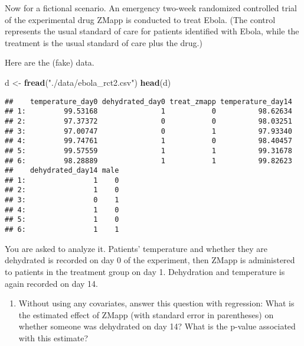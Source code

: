 \documentclass[
]{article}
\newenvironment{Shaded}{\begin{snugshade}}{\end{snugshade}}
\newcommand{\DataTypeTok}[1]{\textcolor[rgb]{0.13,0.29,0.53}{#1}}
\newcommand{\DecValTok}[1]{\textcolor[rgb]{0.00,0.00,0.81}{#1}}
\newcommand{\KeywordTok}[1]{\textcolor[rgb]{0.13,0.29,0.53}{\textbf{#1}}}
\newcommand{\NormalTok}[1]{#1}
\newcommand{\OperatorTok}[1]{\textcolor[rgb]{0.81,0.36,0.00}{\textbf{#1}}}
\newcommand{\StringTok}[1]{\textcolor[rgb]{0.31,0.60,0.02}{#1}}
\providecommand{\tightlist}{%
  \setlength{\itemsep}{0pt}\setlength{\parskip}{0pt}}
\begin{document}
Now for a fictional scenario. An emergency two-week randomized
controlled trial of the experimental drug ZMapp is conducted to treat
Ebola. (The control represents the usual standard of care for patients
identified with Ebola, while the treatment is the usual standard of care
plus the drug.)

Here are the (fake) data.

\begin{Shaded}
\begin{Highlighting}[]
\NormalTok{d <-}\StringTok{ }\KeywordTok{fread}\NormalTok{(}\StringTok{"./data/ebola_rct2.csv"}\NormalTok{)}
\KeywordTok{head}\NormalTok{(d)}
\end{Highlighting}
\end{Shaded}

\begin{verbatim}
##    temperature_day0 dehydrated_day0 treat_zmapp temperature_day14
## 1:         99.53168               1           0          98.62634
## 2:         97.37372               0           0          98.03251
## 3:         97.00747               0           1          97.93340
## 4:         99.74761               1           0          98.40457
## 5:         99.57559               1           1          99.31678
## 6:         98.28889               1           1          99.82623
##    dehydrated_day14 male
## 1:                1    0
## 2:                1    0
## 3:                0    1
## 4:                1    0
## 5:                1    0
## 6:                1    1
\end{verbatim}

You are asked to analyze it. Patients' temperature and whether they are
dehydrated is recorded on day 0 of the experiment, then ZMapp is
administered to patients in the treatment group on day 1. Dehydration
and temperature is again recorded on day 14.

\begin{enumerate}
\def\labelenumi{\arabic{enumi}.}
\tightlist
\item
  Without using any covariates, answer this question with regression:
  What is the estimated effect of ZMapp (with standard error in
  parentheses) on whether someone was dehydrated on day 14? What is the
  p-value associated with this estimate?
\end{enumerate}

\begin{Shaded}
\end{Shaded}
\end{document}
